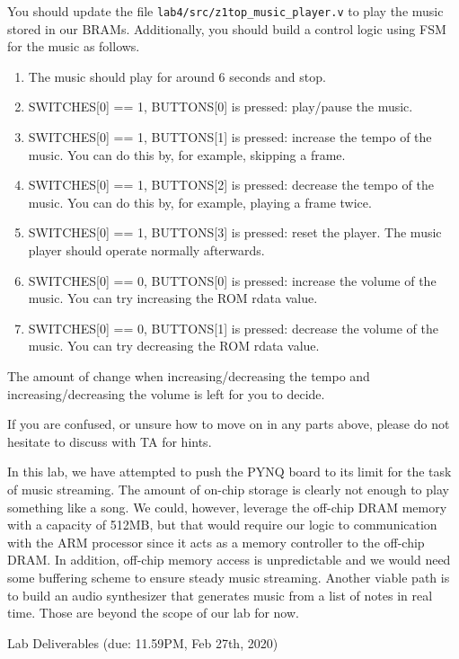 \documentclass[11pt]{article}
\makeatletter
\renewcommand{\section}
{\@startsection {section}{1}{0pt}
 {-2ex}
 {1ex}
 {\bfseries\Large}}
\makeatother
\begin{document}
You should update the file \verb|lab4/src/z1top_music_player.v| to play the music stored in our BRAMs. Additionally, you should build a control logic using FSM for the music as follows.
\begin{enumerate}
  \item The music should play for around 6 seconds and stop.
  \item SWITCHES[0] == 1, BUTTONS[0] is pressed: play/pause the music.
  \item SWITCHES[0] == 1, BUTTONS[1] is pressed: increase the tempo of the music. You can do this by, for example, skipping a frame.
  \item SWITCHES[0] == 1, BUTTONS[2] is pressed: decrease the tempo of the music. You can do this by, for example, playing a frame twice.
  \item SWITCHES[0] == 1, BUTTONS[3] is pressed: reset the player. The music player should operate normally afterwards.
  \item SWITCHES[0] == 0, BUTTONS[0] is pressed: increase the volume of the music. You can try increasing the ROM rdata value.
  \item SWITCHES[0] == 0, BUTTONS[1] is pressed: decrease the volume of the music. You can try decreasing the ROM rdata value.
\end{enumerate}

The amount of change when increasing/decreasing the tempo and increasing/decreasing the volume is left for you to decide.

If you are confused, or unsure how to move on in any parts above, please do not hesitate to discuss with TA for hints.

In this lab, we have attempted to push the PYNQ board to its limit for the task of music streaming. The amount of on-chip storage is clearly not enough to play something like a song. We could, however, leverage the off-chip DRAM memory with a capacity of 512MB, but that would require our logic to communication with the ARM processor since it acts as a memory controller to the off-chip DRAM. In addition, off-chip memory access is unpredictable and we would need some buffering scheme to ensure steady music streaming. Another viable path is to build an audio synthesizer that generates music from a list of notes in real time. Those are beyond the scope of our lab for now.

\section{Lab Deliverables (due: 11.59PM, Feb 27th, 2020)}
\end{document}
